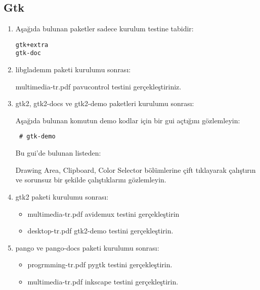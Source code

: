 \documentclass[a4paper,10pt]{article}
\begin{document}
\subsection*{Gtk}
\begin{enumerate}
\item Aşağıda bulunan paketler sadece kurulum testine tabidir:
\begin{verbatim}
gtk+extra
gtk-doc
\end{verbatim}
\item libglademm paketi kurulumu sonrası:

multimedia-tr.pdf pavucontrol testini gerçekleştiriniz.
 
 \item gtk2, gtk2-docs ve gtk2-demo paketleri kurulumu sonrası: 

Aşağıda bulunan komutun demo kodlar için bir gui açtığını gözlemleyin:
\begin{verbatim}
 # gtk-demo
\end{verbatim}

Bu gui'de bulunan listeden:

Drawing Area, Clipboard, Color Selector bölümlerine çift tıklayarak çalıştırın ve sorunsuz bir şekilde çalıştıklarını gözlemleyin.

\item gtk2 paketi kurulumu sonrası: 
\begin{itemize}
 \item multimedia-tr.pdf avidemux testini gerçekleştirin
\item desktop-tr.pdf gtk2-demo testini gerçekleştirin.
\end{itemize}
\item pango ve pango-docs paketi kurulumu sonrası: 
\begin{itemize}
 \item progrmming-tr.pdf pygtk testini gerçekleştirin.
 \item multimedia-tr.pdf inkscape testini gerçekleştirin.
\end{itemize}

\end{enumerate}
\end{document}
